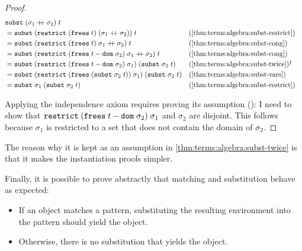 \begin{proof}
  \begin{align*}
    &\holconst{subst}\;(\envadd{\sigma_1}{\sigma_2})\;t \\
    &= \holconst{subst}\;(\holconst{restrict}\;(\holconst{frees}\;t)\;(\envadd{\sigma_1}{\sigma_2}))\;t && \text{(\cref{thm:terms:algebra:subst-restrict})} \\
    &= \holconst{subst}\;(\envadd{\holconst{restrict}\;(\holconst{frees}\;t)\;\sigma_1}{\sigma_2})\;t && \text{(\cref{thm:terms:algebra:subst-cong})} \\
    &= \holconst{subst}\;(\envadd{\holconst{restrict}\;(\holconst{frees}\;t - \holconst{dom}\;\sigma_2)\;\sigma_1}{\sigma_2})\;t && \text{(\cref{thm:terms:algebra:subst-cong})} \\
    &= \holconst{subst}\;(\holconst{restrict}\;(\holconst{frees}\;t - \holconst{dom}\;\sigma_2)\;\sigma_1)\;(\holconst{subst}\;\sigma_2\;t) && \text{(\cref{thm:terms:algebra:subst-twice})\raisebox{3pt}[0pt]{\footnotesize\textdagger}} \\
    &= \holconst{subst}\;(\holconst{restrict}\;(\holconst{frees}\;(\holconst{subst}\;\sigma_2\;t))\;\sigma_1)\;(\holconst{subst}\;\sigma_2\;t) && \text{(\cref{thm:terms:algebra:subst-vars})} \\
    &= \holconst{subst}\;\sigma_1\;(\holconst{subst}\;\sigma_2\;t) && \text{(\cref{thm:terms:algebra:subst-restrict})}
  \end{align*}

  \noindent
  Applying the independence axiom requires proving its assumption (\textdagger):
  I need to show that $\texttt{\textup{restrict}}\;(\texttt{\textup{frees}}\;t - \texttt{\textup{dom}}\;\sigma_2)\;\sigma_1$ and $\sigma_2$ are disjoint.
  This follows because $\sigma_1$ is restricted to a set that does not contain the domain of $\sigma_2$.
\end{proof}

\noindent
The reason why it is kept as an assumption in \cref{thm:terms:algebra:subst-twice} is that it makes the instantiation proofs simpler.

Finally, it is possible to prove abstractly that matching and substitution behave as expected:
\begin{itemize}
  \item If an object matches a pattern, substituting the resulting environment into the pattern should yield the object.
  \item Otherwise, there is no substitution that yields the object.
\end{itemize}

